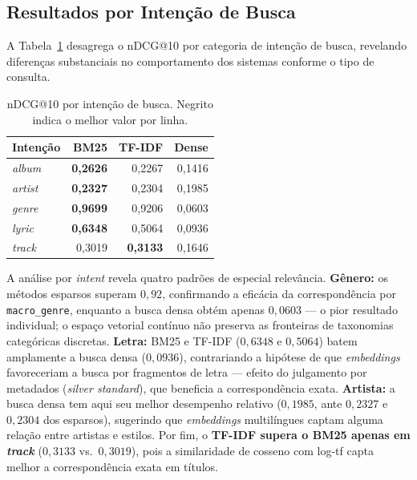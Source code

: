 \documentclass[12pt]{article}
\begin{document}
\subsection{Resultados por Intenção de Busca}

A Tabela~\ref{tab:porintent} desagrega o nDCG@10 por categoria de intenção de
busca, revelando diferenças substanciais no comportamento dos sistemas conforme
o tipo de consulta.

\begin{table}[ht]
\centering
\caption{nDCG@10 por intenção de busca. Negrito indica o melhor valor por linha.}
\label{tab:porintent}
\begin{tabular}{lrrr}
\toprule
\textbf{Intenção} & \textbf{BM25} & \textbf{TF-IDF} & \textbf{Dense} \\
\midrule
\textit{album}  & \textbf{0{,}2626} & 0{,}2267 & 0{,}1416 \\
\textit{artist} & \textbf{0{,}2327} & 0{,}2304 & 0{,}1985 \\
\textit{genre}  & \textbf{0{,}9699} & 0{,}9206 & 0{,}0603 \\
\textit{lyric}  & \textbf{0{,}6348} & 0{,}5064 & 0{,}0936 \\
\textit{track}  & 0{,}3019 & \textbf{0{,}3133} & 0{,}1646 \\
\bottomrule
\end{tabular}
\end{table}

A análise por \textit{intent} revela quatro padrões de especial relevância.
\textbf{Gênero:} os métodos esparsos superam $0{,}92$, confirmando a eficácia da
correspondência por \texttt{macro\_genre}, enquanto a busca densa obtém apenas
$0{,}0603$ --- o pior resultado individual; o espaço vetorial contínuo não
preserva as fronteiras de taxonomias categóricas discretas. \textbf{Letra:} BM25
e TF-IDF ($0{,}6348$ e $0{,}5064$) batem amplamente a busca densa ($0{,}0936$),
contrariando a hipótese de que \textit{embeddings} favoreceriam a busca por
fragmentos de letra --- efeito do julgamento por metadados (\textit{silver
standard}), que beneficia a correspondência exata. \textbf{Artista:} a busca
densa tem aqui seu melhor desempenho relativo ($0{,}1985$, ante $0{,}2327$ e
$0{,}2304$ dos esparsos), sugerindo que \textit{embeddings} multilíngues captam
alguma relação entre artistas e estilos. Por fim, o \textbf{TF-IDF supera o BM25
apenas em \textit{track}} ($0{,}3133$ vs.\ $0{,}3019$), pois a similaridade de
cosseno com log-tf capta melhor a correspondência exata em títulos.
\end{document}
